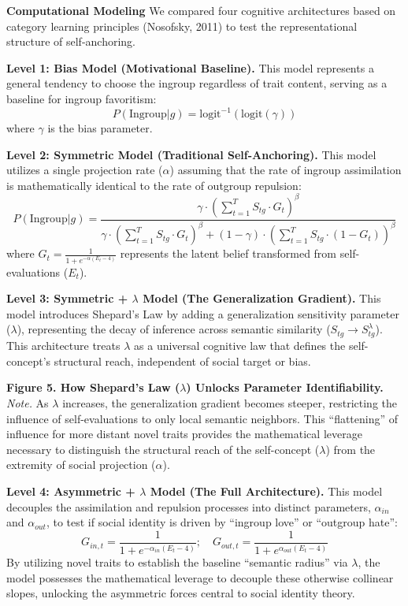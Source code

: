 \documentclass[
  man,
  longtable,
  nolmodern,
  notxfonts,
  notimes,
  man]{apa7}
\begin{document}
\textbf{Computational Modeling} We compared four cognitive architectures
based on category learning principles (Nosofsky, 2011) to test the
representational structure of self-anchoring.

\textbf{Level 1: Bias Model (Motivational Baseline).} This model
represents a general tendency to choose the ingroup regardless of trait
content, serving as a baseline for ingroup favoritism:
\[P(\text{Ingroup} | g) = \text{logit}^{-1}(\text{logit}(\gamma))\]
where \(\gamma\) is the bias parameter.

\textbf{Level 2: Symmetric Model (Traditional Self-Anchoring).} This
model utilizes a single projection rate (\(\alpha\)) assuming that the
rate of ingroup assimilation is mathematically identical to the rate of
outgroup repulsion:
\[P(\text{Ingroup} | g) = \frac{\gamma \cdot (\sum_{t=1}^T S_{tg} \cdot G_t)^\beta}{\gamma \cdot (\sum_{t=1}^T S_{tg} \cdot G_t)^\beta + (1-\gamma) \cdot (\sum_{t=1}^T S_{tg} \cdot (1-G_t))^\beta}\]
where \(G_t = \frac{1}{1 + e^{-\alpha(E_t-4)}}\) represents the latent
belief transformed from self-evaluations (\(E_t\)).

\textbf{Level 3: Symmetric + \(\lambda\) Model (The Generalization
Gradient).} This model introduces Shepard's Law by adding a
generalization sensitivity parameter (\(\lambda\)), representing the
decay of inference across semantic similarity
(\(S_{tg} \rightarrow S_{tg}^\lambda\)). This architecture treats
\(\lambda\) as a universal cognitive law that defines the self-concept's
structural reach, independent of social target or bias.

\textbf{Figure 5. How Shepard's Law (\(\lambda\)) Unlocks Parameter
Identifiability.} \emph{Note.} As \(\lambda\) increases, the
generalization gradient becomes steeper, restricting the influence of
self-evaluations to only local semantic neighbors. This ``flattening''
of influence for more distant novel traits provides the mathematical
leverage necessary to distinguish the structural reach of the
self-concept (\(\lambda\)) from the extremity of social projection
(\(\alpha\)).

\textbf{Level 4: Asymmetric + \(\lambda\) Model (The Full
Architecture).} This model decouples the assimilation and repulsion
processes into distinct parameters, \(\alpha_{in}\) and
\(\alpha_{out}\), to test if social identity is driven by ``ingroup
love'' or ``outgroup hate'':
\[G_{in,t} = \frac{1}{1 + e^{-\alpha_{in}(E_t-4)}} ; \quad G_{out,t} = \frac{1}{1 + e^{\alpha_{out}(E_t-4)}}\]
By utilizing novel traits to establish the baseline ``semantic radius''
via \(\lambda\), the model possesses the mathematical leverage to
decouple these otherwise collinear slopes, unlocking the asymmetric
forces central to social identity theory.
\end{document}
